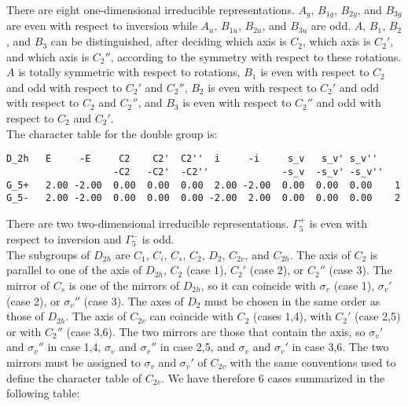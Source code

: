 \documentclass[12pt,a4paper,twoside]{report}
\begin{document}
There are eight one-dimensional irreducible representations. $A_g$, $B_{1g}$,
$B_{2g}$, and $B_{3g}$ are even with respect to inversion while $A_u$, $B_{1u}$,
$B_{2u}$, and $B_{3u}$ are odd. $A$, $B_1$, $B_2$, and $B_3$ can be distinguished,
after deciding which axis is $C_2$, which axis is $C_2'$, and which axis
is $C_2''$, according to the symmetry with respect to these rotations.
$A$ is totally symmetric with respect to rotations, $B_1$ is even with
respect to $C_2$ and odd with respect to $C_2'$ and $C_2''$, 
$B_2$ is even with respect to $C_2'$ and odd with respect to $C_2$ and $C_2''$,
and $B_3$ is even with respect to $C_2''$ and odd with respect to
$C_2$ and $C_2'$.\\
The character table for the double group is:

\begin{tcolorbox}
\begin{footnotesize}
\begin{verbatim}
D_2h   E     -E     C2    C2'  C2''  i     -i     s_v   s_v' s_v''
                   -C2   -C2'  -C2''             -s_v  -s_v' -s_v''
G_5+   2.00 -2.00  0.00  0.00  0.00  2.00 -2.00  0.00  0.00  0.00    1
G_5-   2.00 -2.00  0.00  0.00  0.00 -2.00  2.00  0.00  0.00  0.00    2
\end{verbatim}
\end{footnotesize}
\end{tcolorbox}

There are two two-dimensional irreducible representations. $\Gamma_5^+$ is 
even with respect to inversion and $\Gamma_5^-$ is odd. \\
The subgroups of $D_{2h}$ are $C_1$, $C_i$, $C_s$, $C_2$, $D_2$, $C_{2v}$, and
$C_{2h}$. The axis of $C_2$ is parallel to one of
the axis of $D_{2h}$, $C_2$ (case 1), $C_2'$ (case 2), or $C_2''$ (case 3). 
The mirror of $C_s$ is one of the mirrors of $D_{2h}$,
so it can coincide with $\sigma_v$ (case 1), $\sigma_v'$ (case 2), or
$\sigma_v''$ (case 3). The axes of $D_2$ must be chosen in the same order
as those of $D_{2h}$. The axis of $C_{2v}$ can coincide with $C_2$
(cases 1,4), with $C_2'$ (case 2,5) or with $C_2''$ (case 3,6). The two mirrors
are those that contain the axis, so $\sigma_v'$ and $\sigma_v''$
in case 1,4, $\sigma_v$ and $\sigma_v''$ in case 2,5, and $\sigma_v$ and 
$\sigma_v'$ in case 3,6. The two mirrors must be assigned to $\sigma_v$ and
$\sigma_v'$ of $C_{2v}$ with the same conventions used to define the character 
table of $C_{2v}$. We have therefore $6$ cases summarized in the following table:
\end{document}
